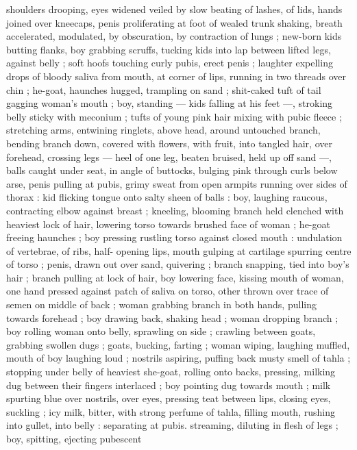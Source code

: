 shoulders drooping, eyes widened veiled by slow beating of lashes, 
of lids, hands joined over kneecaps, penis proliferating at foot of 
wealed trunk shaking, breath accelerated, modulated, by 
obscuration, by contraction of lungs ; new-born kids butting flanks, 
boy grabbing scruffs, tucking kids into lap between lifted legs, 
against belly ; soft hoofs touching curly pubis, erect penis ; laughter 
expelling drops of bloody saliva from mouth, at corner of lips, 
running in two threads over chin ; he-goat, haunches hugged, 
trampling on sand ; shit-caked tuft of tail gagging woman's mouth ; 
boy, standing --- kids falling at his feet ---, stroking belly sticky with 
meconium ; tufts of young pink hair mixing with pubic fleece ; 
stretching arms, entwining ringlets, above head, around untouched 
branch, bending branch down, covered with flowers, with fruit, into 
tangled hair, over forehead, crossing legs --- heel of one leg, beaten 
bruised, held up off sand ---, balls caught under seat, in angle of 
buttocks, bulging pink through curls below arse, penis pulling at 
pubis, grimy sweat from open armpits running over sides of thorax : 
kid flicking tongue onto salty sheen of balls : boy, laughing raucous, 
contracting elbow against breast ; kneeling, blooming branch held 
clenched with heaviest lock of hair, lowering torso towards brushed 
face of woman ; he-goat freeing haunches ; boy pressing rustling 
torso against closed mouth : undulation of vertebrae, of ribs, half- 
opening lips, mouth gulping at cartilage spurring centre of torso ; 
penis, drawn out over sand, quivering ; branch snapping, tied into 
boy's hair ; branch pulling at lock of hair, boy lowering face, kissing 
mouth of woman, one hand pressed against patch of saliva on torso, 
other thrown over trace of semen on middle of back ; woman 
grabbing branch in both hands, pulling towards forehead ; boy 
drawing back, shaking head ; woman dropping branch ; boy rolling 
woman onto belly, sprawling on side ; crawling between goats, 
grabbing swollen dugs ; goats, bucking, farting ; woman wiping, 
laughing muffled, mouth of boy laughing loud ; nostrils aspiring, 
puffing back musty smell of tahla ; stopping under belly of heaviest 
she-goat, rolling onto backs, pressing, milking dug between their 
fingers interlaced ; boy pointing dug towards mouth ; milk spurting 
blue over nostrils, over eyes, pressing teat between lips, closing 
eyes, suckling ; icy milk, bitter, with strong perfume of tahla, filling 
mouth, rushing into gullet, into belly : separating at pubis. 
streaming, diluting in flesh of legs ; boy, spitting, ejecting pubescent 
